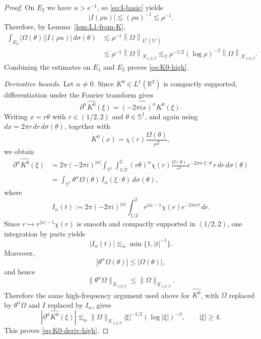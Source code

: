 \documentclass[11pt]{amsart}
\theoremstyle{remark}
\numberwithin{equation}{section}
\newcommand{\R}{\mathbb R}
\newcommand{\Sph}{\mathbb S^1}
\newcommand{\cK}{\mathcal K}
\newcommand{\norm}[1]{\left\lVert #1\right\rVert}
\newcommand{\abs}[1]{\left\lvert #1\right\rvert}
\begin{document}
\begin{proof}
		On \(E_2\) we have \(u>e^{-1}\), so \eqref{eq:I-basic} yields
		\[
		\abs{I(\rho u)}\lesssim (\rho u)^{-1}\lesssim \rho^{-1}.
		\]
		Therefore, by Lemma~\ref{lem:L1-from-K},
		\begin{align*}
			\int_{E_2}\abs{\Omega(\theta)}\abs{I(\rho u)}\,d\sigma(\theta)
			&\lesssim
			\rho^{-1}\norm{\Omega}_{L^1(\Sph)}
			\\
			&\lesssim
			\rho^{-1}\norm{\Omega}_{\cK_{1/2,\beta}}
			\lesssim_\beta
			\rho^{-1/2}(\log\rho)^{-\beta}\norm{\Omega}_{\cK_{1/2,\beta}}.
		\end{align*}
		Combining the estimates on \(E_1\) and \(E_2\) proves \eqref{eq:K0-high}.
		
		\smallskip
		\noindent\emph{Derivative bounds.}
		Let \(\alpha\neq 0\). Since \(K^0\in L^1(\R^2)\) is compactly supported, differentiation under the Fourier transform gives
		\[
		\partial^\alpha\widehat{K^0}(\xi)
		=
		\widehat{(-2\pi i x)^\alpha K^0}(\xi).
		\]
		Writing \(x=r\theta\) with \(r\in(1/2,2)\) and \(\theta\in\Sph\), and again
		using \(dx=2\pi r\,dr\,d\sigma(\theta)\), together with
		\[
		K^0(x)=\chi(r)\frac{\Omega(\theta)}{r^2},
		\]
		we obtain
		\begin{align*}
			\partial^\alpha\widehat{K^0}(\xi)
			&=
			2\pi(-2\pi i)^{|\alpha|}
			\int_{\Sph}\int_{1/2}^2
			(r\theta)^\alpha
			\chi(r)\frac{\Omega(\theta)}{r^2}
			e^{-2\pi i r\,\xi\cdot\theta}\, r\,dr\,d\sigma(\theta) \\
			&=
			\int_{\Sph}\theta^\alpha \Omega(\theta)\,
			I_\alpha(\xi\cdot\theta)\,d\sigma(\theta),
		\end{align*}
		where
		\[
		I_\alpha(t):=
		2\pi(-2\pi i)^{|\alpha|}
		\int_{1/2}^2 r^{|\alpha|-1}\chi(r)e^{-2\pi i rt}\,dr.
		\]
		Since \(r\mapsto r^{|\alpha|-1}\chi(r)\) is smooth and compactly supported in \((1/2,2)\), one integration by parts yields
		\[
		|I_\alpha(t)|\lesssim_\alpha \min\{1,|t|^{-1}\}.
		\]
		Moreover,
		\[
		|\theta^\alpha \Omega(\theta)|\le |\Omega(\theta)|,
		\]
		and hence
		\[
		\|\theta^\alpha\Omega\|_{\cK_{1/2,\beta}}
		\le
		\|\Omega\|_{\cK_{1/2,\beta}}.
		\]
		Therefore the same high-frequency argument used above for \(\widehat{K^0}\), with
		\(\Omega\) replaced by \(\theta^\alpha\Omega\) and \(I\) replaced by \(I_\alpha\),
		gives
		\[
		|\partial^\alpha\widehat{K^0}(\xi)|
		\lesssim_\alpha
		\|\Omega\|_{\cK_{1/2,\beta}}
		|\xi|^{-1/2}(\log |\xi|)^{-\beta},
		\qquad |\xi|\ge 4.
		\]
		This proves \eqref{eq:K0-deriv-high}.
	\end{proof}
	
\end{document}
